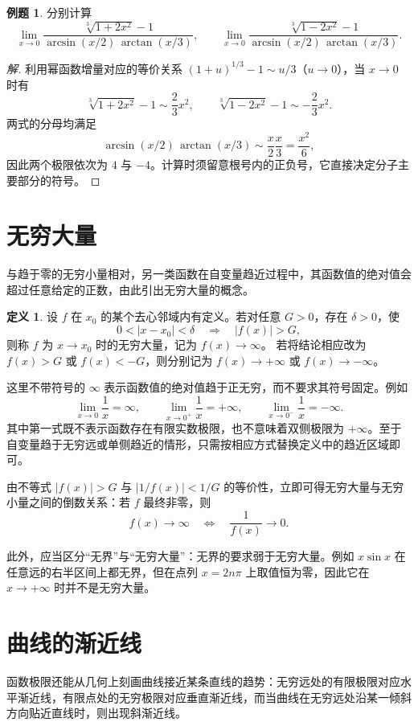 \documentclass[UTF8,fontset=fandol,a4paper,12pt]{ctexart}
\theoremstyle{definition}
\newtheorem*{definition}{定义}
\newtheorem*{example}{例题}
\begin{document}
\begin{example}
分别计算
\[
 \lim_{x\to0}\frac{\sqrt[3]{1+2x^2}-1}
 {\arcsin(x/2)\,\arctan(x/3)},\qquad
 \lim_{x\to0}\frac{\sqrt[3]{1-2x^2}-1}
 {\arcsin(x/2)\,\arctan(x/3)}.
\]
\end{example}
\begin{proof}[解]
利用幂函数增量对应的等价关系 $(1+u)^{1/3}-1\sim u/3$（$u\to0$），当 $x\to0$ 时有
\[
 \sqrt[3]{1+2x^2}-1\sim\frac23x^2,\qquad
 \sqrt[3]{1-2x^2}-1\sim-\frac23x^2.
\]
两式的分母均满足
\[
 \arcsin(x/2)\,\arctan(x/3)\sim\frac x2\frac x3=\frac{x^2}{6},
\]
因此两个极限依次为 $4$ 与 $-4$。计算时须留意根号内的正负号，它直接决定分子主要部分的符号。
\end{proof}

\section{无穷大量}
与趋于零的无穷小量相对，另一类函数在自变量趋近过程中，其函数值的绝对值会超过任意给定的正数，由此引出无穷大量的概念。

\begin{definition}
设 $f$ 在 $x_0$ 的某个去心邻域内有定义。若对任意 $G>0$，存在 $\delta>0$，使
\[
 0<|x-x_0|<\delta\quad\Longrightarrow\quad |f(x)|>G,
\]
则称 $f$ 为 $x\to x_0$ 时的无穷大量，记为 $f(x)\to\infty$。
若将结论相应改为 $f(x)>G$ 或 $f(x)<-G$，则分别记为 $f(x)\to+\infty$ 或 $f(x)\to-\infty$。
\end{definition}

这里不带符号的 $\infty$ 表示函数值的绝对值趋于正无穷，而不要求其符号固定。例如
\[
 \lim_{x\to0}\frac1x=\infty,\qquad
 \lim_{x\to0^+}\frac1x=+\infty,\qquad
 \lim_{x\to0^-}\frac1x=-\infty.
\]
其中第一式既不表示函数存在有限实数极限，也不意味着双侧极限为 $+\infty$。至于自变量趋于无穷远或单侧趋近的情形，只需按相应方式替换定义中的趋近区域即可。

由不等式 $|f(x)|>G$ 与 $|1/f(x)|<1/G$ 的等价性，立即可得无穷大量与无穷小量之间的倒数关系：若 $f$ 最终非零，则
\[
 f(x)\to\infty\quad\Longleftrightarrow\quad\frac1{f(x)}\to0.
\]

此外，应当区分“无界”与“无穷大量”：无界的要求弱于无穷大量。例如 $x\sin x$ 在任意远的右半区间上都无界，但在点列 $x=2n\pi$ 上取值恒为零，因此它在 $x\to+\infty$ 时并不是无穷大量。

\section{曲线的渐近线}
函数极限还能从几何上刻画曲线接近某条直线的趋势：无穷远处的有限极限对应水平渐近线，有限点处的无穷极限对应垂直渐近线，而当曲线在无穷远处沿某一倾斜方向贴近直线时，则出现斜渐近线。
\end{document}

